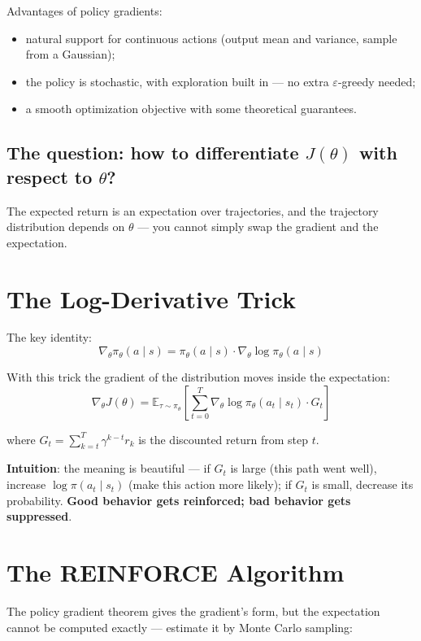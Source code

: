 \documentclass{article}
\begin{document}
Advantages of policy gradients:
\begin{itemize}
  \item natural support for continuous actions (output mean and variance, sample from a Gaussian);
  \item the policy is stochastic, with exploration built in --- no extra $\varepsilon$-greedy needed;
  \item a smooth optimization objective with some theoretical guarantees.
\end{itemize}

\subsection*{The question: how to differentiate $J(\theta)$ with respect to $\theta$?}

The expected return is an expectation over trajectories, and the trajectory distribution depends on $\theta$ --- you cannot simply swap the gradient and the expectation.

\section*{The Log-Derivative Trick}

The key identity:
\[
\nabla_\theta \pi_\theta(a \mid s) = \pi_\theta(a \mid s) \cdot \nabla_\theta \log \pi_\theta(a \mid s)
\]

With this trick the gradient of the distribution moves inside the expectation:
\[
\boxed{\nabla_\theta J(\theta) = \mathbb{E}_{\tau \sim \pi_\theta}\!\left[\sum_{t=0}^{T} \nabla_\theta \log \pi_\theta(a_t \mid s_t) \cdot G_t \right]}
\]

where $G_t = \sum_{k=t}^{T} \gamma^{k-t} r_k$ is the discounted return from step $t$.

\textbf{Intuition}: the meaning is beautiful --- if $G_t$ is large (this path went well), increase $\log \pi(a_t \mid s_t)$ (make this action more likely); if $G_t$ is small, decrease its probability. \textbf{Good behavior gets reinforced; bad behavior gets suppressed}.

\section*{The REINFORCE Algorithm}

The policy gradient theorem gives the gradient's form, but the expectation cannot be computed exactly --- estimate it by Monte Carlo sampling:
\end{document}
